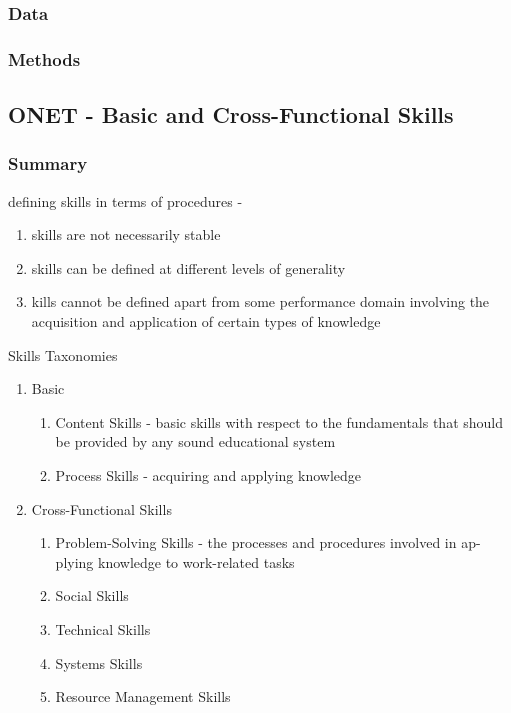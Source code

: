 \documentclass[12pt]{article}
\begin{document}
\subsubsection*{Data}

\subsubsection*{Methods}

\subsection*{ONET - Basic and Cross-Functional Skills\cite{onet}}

\subsubsection*{Summary}

defining skills in terms of procedures -
\begin{enumerate}
    \item skills are not necessarily stable
    \item skills can be defined at different levels of generality
    \item kills cannot be defined apart from some performance domain involving the acquisition and application of certain types of knowledge
\end{enumerate}

Skills Taxonomies 
\begin{enumerate}
    \item Basic
    \begin{enumerate}
        \item Content Skills - basic skills with respect to the fundamentals that should be provided by any sound educational system
        \item Process Skills - acquiring and applying knowledge
    \end{enumerate}
    \item Cross-Functional Skills
    \begin{enumerate}
        \item Problem-Solving Skills - the processes and procedures involved in ap- plying knowledge to work-related tasks
        \item Social Skills
        \item Technical Skills
        \item Systems Skills
        \item Resource Management Skills
    \end{enumerate}
\end{enumerate}
\end{document}
